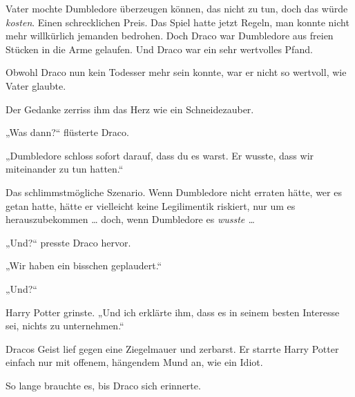 Vater mochte Dumbledore überzeugen können, das nicht zu tun, doch das würde \emph{kosten}. Einen schrecklichen Preis. Das Spiel hatte jetzt Regeln, man konnte nicht mehr willkürlich jemanden bedrohen. Doch Draco war Dumbledore aus freien Stücken in die Arme gelaufen. Und Draco war ein sehr wertvolles Pfand.

Obwohl Draco nun kein Todesser mehr sein konnte, war er nicht so wertvoll, wie Vater glaubte.

Der Gedanke zerriss ihm das Herz wie ein Schneidezauber.

„Was dann?“ flüsterte Draco.

„Dumbledore schloss sofort darauf, dass du es warst. Er wusste, dass wir miteinander zu tun hatten.“

Das schlimmstmögliche Szenario. Wenn Dumbledore nicht erraten hätte, wer es getan hatte, hätte er vielleicht keine Legilimentik riskiert, nur um es herauszubekommen … doch, wenn Dumbledore es \emph{wusste …}

„Und?“ presste Draco hervor.

„Wir haben ein bisschen geplaudert.“

„Und?“

Harry Potter grinste.
„Und ich erklärte ihm, dass es in seinem besten Interesse sei, nichts zu unternehmen.“

Dracos Geist lief gegen eine Ziegelmauer und zerbarst. Er starrte Harry Potter einfach nur mit offenem, hängendem Mund an, wie ein Idiot.

So lange brauchte es, bis Draco sich erinnerte.

